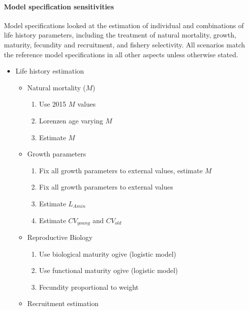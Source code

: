 \documentclass[11pt,
  letterpaper,
]{article}
\providecommand{\tightlist}{%
  \setlength{\itemsep}{0pt}\setlength{\parskip}{0pt}}
\providecommand{\tightlist}{%
  \setlength{\itemsep}{0pt}\setlength{\parskip}{0pt}}
\begin{document}
\hypertarget{model-specification-sensitivities-1}{%
\paragraph{Model specification sensitivities}\label{model-specification-sensitivities-1}}

Model specifications looked at the estimation of individual and combinations of life history parameters, including the treatment of natural mortality, growth, maturity, fecundity and recruitment, and fishery selectivity. All scenarios match the reference model specifications in all other aspects unless otherwise stated.

\begin{itemize}
\item
  Life history estimation

  \begin{itemize}
  \tightlist
  \item
    Natural mortality (\(M\))

    \begin{enumerate}
    \def\labelenumi{\arabic{enumi}.}
    \tightlist
    \item
      Use 2015 \(M\) values
    \item
      Lorenzen age varying \(M\)
    \item
      Estimate \(M\)
    \end{enumerate}
  \item
    Growth parameters

    \begin{enumerate}
    \def\labelenumi{\arabic{enumi}.}
    \setcounter{enumi}{3}
    \tightlist
    \item
      Fix all growth parameters to external values, estimate \(M\)
    \item
      Fix all growth parameters to external values
    \item
      Estimate \(L_{Amin}\)
    \item
      Estimate \(CV_{young}\) and \(CV_{old}\)
    \end{enumerate}
  \item
    Reproductive Biology

    \begin{enumerate}
    \def\labelenumi{\arabic{enumi}.}
    \setcounter{enumi}{7}
    \tightlist
    \item
      Use biological maturity ogive (logistic model)
    \item
      Use functional maturity ogive (logistic model)
    \item
      Fecundity proportional to weight
    \end{enumerate}
  \item
    Recruitment estimation


\end{itemize}
\end{itemize}
\end{document}

